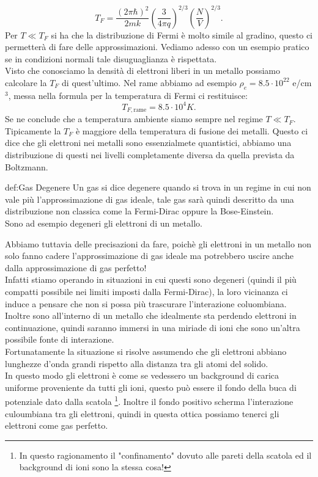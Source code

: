 \[
	T_{F} = \frac{\left( 2\pi \hbar  \right)^2}{2m k} \left( \frac{3}{4\pi q} \right)^{2 /3} \left( \frac{N}{V} \right) ^{2 /3}
.\] 
Per $T\ll T_{F}$ si ha che la distribuzione di Fermi è molto simile al gradino, questo ci permetterà di fare delle approssimazioni. Vediamo adesso con un esempio pratico se in condizioni normali tale disuguaglianza è rispettata.\\
Visto che conosciamo la densità di elettroni liberi in un metallo possiamo calcolare la $T_{F}$ di quest'ultimo. Nel rame abbiamo ad esempio $\rho _{e}= 8.5 \cdot 10^{22}$ e/cm$^3$, messa nella formula per la temperatura di Fermi ci restituisce:
\[
	T_{F, \text{rame}} = 8.5 \cdot 10^{4} K
.\] 
Se ne conclude che a temperatura ambiente siamo sempre nel regime $T \ll T_{F}$.\\
Tipicamente la $T_{F}$ è maggiore della temperatura di fusione dei metalli. Questo ci dice che gli elettroni nei metalli sono essenzialmete quantistici, abbiamo una distribuzione di questi nei livelli completamente diversa da quella prevista da Boltzmann.
\begin{defn}{def:Gas Degenere}
	Un gas si dice degenere quando si trova in un regime in cui non vale più l'approssimazione di gas ideale, tale gas sarà quindi descritto da una distribuzione non classica come la Fermi-Dirac oppure la Bose-Einstein.\\
	Sono ad esempio degeneri gli elettroni di un metallo.
\end{defn}
Abbiamo tuttavia delle precisazioni da fare, poichè gli elettroni in un metallo non solo fanno cadere l'approssimazione di gas ideale ma potrebbero uscire anche dalla approssimazione di gas perfetto!\\
Infatti stiamo operando in situazioni in cui questi sono degeneri (quindi il più compatti possibile nei limiti imposti dalla Fermi-Dirac), la loro vicinanza ci induce a pensare che non si possa più trascurare l'interazione coluombiana. Inoltre sono all'interno di un metallo che idealmente sta perdendo elettroni in continuazione, quindi saranno immersi in una miriade di ioni che sono un'altra possibile fonte di interazione.\\
Fortunatamente la situazione si risolve assumendo che gli elettroni abbiano lunghezze d'onda grandi rispetto alla distanza tra gli atomi del solido.\\
In questo modo gli elettroni è come se vedessero un background di carica uniforme proveniente da tutti gli ioni, questo può essere il fondo della buca di potenziale dato dalla scatola \footnote{In questo ragionamento il "confinamento" dovuto alle pareti della scatola ed il background di ioni sono la stessa cosa!}. Inoltre il fondo positivo scherma l'interazione culoumbiana tra gli elettroni, quindi in questa ottica possiamo tenerci gli elettroni come gas perfetto.\\
